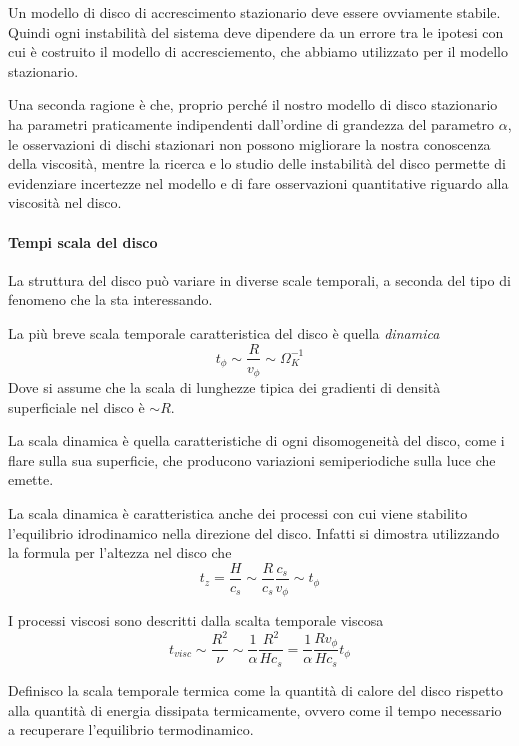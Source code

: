 \documentclass[a4paperbi]{article}
\begin{document}
	Un modello di disco di accrescimento stazionario deve essere ovviamente stabile. Quindi ogni instabilità del sistema deve dipendere da un errore tra le ipotesi con cui è costruito il modello di accresciemento, che abbiamo utilizzato per il modello stazionario.
	
	Una seconda ragione è che, proprio perché il nostro modello di disco stazionario ha parametri praticamente indipendenti dall'ordine di grandezza del parametro $\alpha$, le osservazioni di dischi stazionari non possono migliorare la nostra conoscenza della viscosità, mentre la ricerca e lo studio delle instabilità del disco permette di evidenziare incertezze nel modello e di fare osservazioni quantitative riguardo alla viscosità nel disco.
	
	\paragraph{Tempi scala del disco}
	La struttura del disco può variare in diverse scale temporali, a seconda del tipo di fenomeno che la sta interessando. 	
	
	La più breve scala temporale caratteristica del disco è quella \textit{dinamica}
	\begin{equation}
		t_\phi\sim\frac{R}{v_\phi}\sim\Omega_K^{-1}
	\end{equation}
	Dove si assume che la scala di lunghezze tipica dei gradienti di densità superficiale nel disco è $\sim R$.
	
	La scala dinamica è quella caratteristiche di ogni disomogeneità del disco, come i flare sulla sua superficie, che producono variazioni semiperiodiche sulla luce che emette.
	
	La scala dinamica è caratteristica anche dei processi con cui viene stabilito l'equilibrio idrodinamico nella direzione del disco. Infatti si dimostra utilizzando la formula per l'altezza nel disco che
	\begin{equation}
		t_z=\frac{H}{c_s}\sim \frac{R}{c_s}\frac{c_s}{v_\phi}\sim t_\phi
	\end{equation}
	
	I processi viscosi sono descritti dalla scalta temporale viscosa
	\begin{equation}
		t_{visc}\sim\frac{R^2}{\nu}\sim\frac{1}{\alpha}\frac{R^2}{Hc_s}=\frac{1}{\alpha}\frac{Rv_\phi}{Hc_s}t_\phi
	\end{equation}

	Definisco la scala temporale termica come la quantità di calore del disco rispetto alla quantità di energia dissipata termicamente, ovvero come il tempo necessario a recuperare l'equilibrio termodinamico.
	
\end{document}
